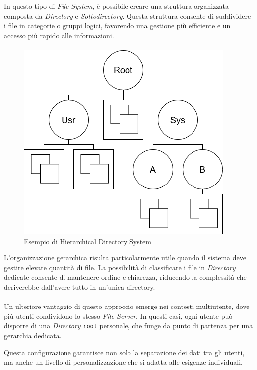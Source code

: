 \documentclass[12pt,a4paper,openright,twoside]{book}
\begin{document}
            In questo tipo di \textit{File System}, è possibile creare una struttura organizzata composta da \textit{Directory} e \textit{Sottodirectory}. Questa struttura consente di suddividere i file in categorie o gruppi logici, favorendo una gestione più efficiente e un accesso più rapido alle informazioni.
            
            \paragraph*{}
            
            \begin{figure}
                \centering
                \includegraphics[width=.5\linewidth]{figures/MultipleDirSystem.png}
                \caption{Esempio di Hierarchical Directory System}
                \label{fig:hierarchical-directory}
            \end{figure}

            L'organizzazione gerarchica risulta particolarmente utile quando il sistema deve gestire elevate quantità di file. La possibilità di classificare i file in \textit{Directory} dedicate consente di mantenere ordine e chiarezza, riducendo la complessità che deriverebbe dall'avere tutto in un'unica directory.

            \paragraph*{}

            Un ulteriore vantaggio di questo approccio emerge nei contesti multiutente, dove più utenti condividono lo stesso \textit{File Server}. In questi casi, ogni utente può disporre di una \textit{Directory} \texttt{root} personale, che funge da punto di partenza per una gerarchia dedicata.

            Questa configurazione garantisce non solo la separazione dei dati tra gli utenti, ma anche un livello di personalizzazione che si adatta alle esigenze individuali.
\end{document}
